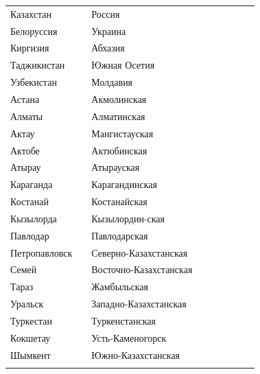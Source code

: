 \documentclass[12pt, a4paper]{article}
\begin{document}
\begin{figure}[t]
\scriptsize 
\begin{tabular}[b]{ V{2.8} m{2.0cm} V{2.8} m{6.2cm} V{2.8} m{2.0cm} V{2.8}  m{8.0cm }V{2.8}} 
Казахстан &  & Россия &  \\ [0.65cm]
Белоруссия &  & Украина &  \\ [0.65cm]
Киргизия &  & Абхазия &  \\ [0.65cm]
Таджикистан &  & Южная Осетия &  \\ [0.65cm]
Узбекистан &  & Молдавия &  \\ [0.65cm]
Астана &  & Акмолинская &  \\ [0.65cm]
Алматы &  & Алматинская &  \\ [0.65cm]
Актау &  & Мангистауская &  \\ [0.65cm]
Актобе &  & Актюбинская &  \\ [0.65cm]
Атырау &  & Атырауская  &  \\ [0.65cm]
Караганда &  & Карагандинская &  \\ [0.65cm]
Костанай &  & Костанайская &  \\ [0.65cm]
Кызылорда &  & Кызылордин-ская &  \\ [0.65cm]
Павлодар &  & Павлодарская &  \\ [0.65cm]
Петропавловск &  & Северно-Казахстанская &  \\ [0.65cm]
Семей &  & Восточно-Казахстанская &  \\ [0.65cm]
Тараз &  & Жамбыльская &  \\ [0.65cm]
Уральск &  & Западно-Казахстанская &  \\ [0.65cm]
Туркестан &  & Туркенстанская &  \\ [0.65cm]
Кокшетау &  & Усть-Каменогорск &  \\ [0.65cm]
Шымкент &  & Южно-Казахстанская &  \\ [0.65cm]
\end{tabular}
\end{figure}
\end{document}
